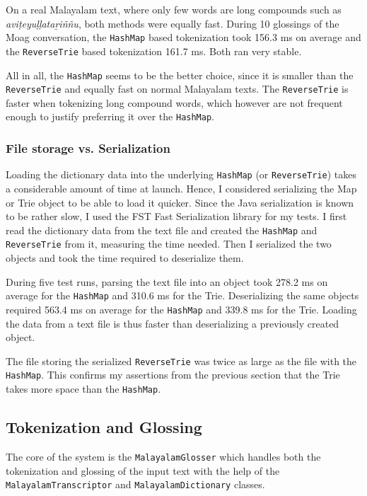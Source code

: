\documentclass[a4paper]{article}
\newcommand{\typ}[1]{\texttt{#1}}
\begin{document}
On a real Malayalam text, where only few words are long compounds such as \textit{aviṭeyuḷḷataṟiññu}, both methods were equally fast. During 10 glossings of the Moag conversation, the \typ{HashMap} based tokenization took 156.3 ms on average and the \typ{ReverseTrie} based tokenization 161.7 ms. Both ran very stable.

All in all, the \typ{HashMap} seems to be the better choice, since it is smaller than the \typ{ReverseTrie} and equally fast on normal Malayalam texts. The \typ{ReverseTrie} is faster when tokenizing long compound words, which however are not frequent enough to justify preferring it over the \typ{HashMap}.

\subsubsection*{File storage vs. Serialization}

Loading the dictionary data into the underlying \typ{HashMap} (or \typ{ReverseTrie}) takes a considerable amount of time at launch. Hence, I considered serializing the Map or Trie object to be able to load it quicker. Since the Java serialization is known to be rather slow, I used the FST Fast Serialization library \parencite{fastSerialization} for my tests. I first read the dictionary data from the text file and created the \typ{HashMap} and \typ{ReverseTrie} from it, measuring the time needed. Then I serialized the two objects and took the time required to deserialize them.

During five test runs, parsing the text file into an object took 278.2 ms on average for the \typ{HashMap} and 310.6 ms for the Trie. Deserializing the same objects required 563.4 ms on average for the \typ{HashMap} and 339.8 ms for the Trie. Loading the data from a text file is thus faster than deserializing a previously created object.

The file storing the serialized \typ{ReverseTrie} was twice as large as the file with the \typ{HashMap}. This confirms my assertions from the previous section that the Trie takes more space than the \typ{HashMap}.


\subsection{Tokenization and Glossing}

The core of the system is the \typ{MalayalamGlosser} which handles both the tokenization and glossing of the input text with the help of the \typ{MalayalamTranscriptor} and \typ{MalayalamDictionary} classes.
\end{document}
